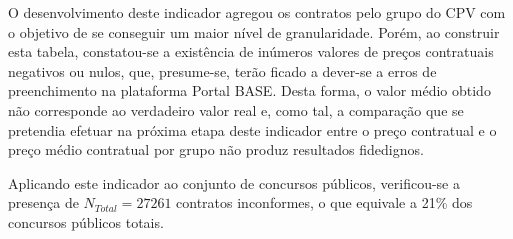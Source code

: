 O desenvolvimento deste indicador agregou os contratos pelo grupo do CPV com o objetivo de se conseguir um maior nível de granularidade. Porém, ao construir esta tabela, constatou-se a existência de inúmeros valores de preços contratuais  negativos ou  nulos,  que, presume-se, terão ficado a dever-se a erros de preenchimento na plataforma Portal BASE. Desta forma, o valor médio obtido não corresponde ao verdadeiro valor real e, como tal, a comparação que se pretendia efetuar na próxima etapa deste indicador entre o preço contratual e o preço médio contratual por grupo não produz resultados fidedignos. 

Aplicando este indicador ao conjunto de concursos públicos, verificou-se a presença de $N_{Total} = 27261$ contratos inconformes, o que equivale a 21\% dos concursos públicos totais.  

\vfill

